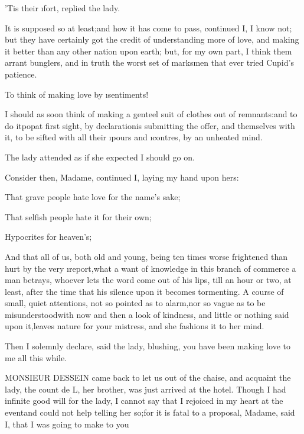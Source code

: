 \documentclass[twoside]{article}
\begin{document}
’Tis their \i{fort}, replied the lady.

It is supposed so at least;\tsk and how it has come to pass, continued I, I
know not; but they have certainly got the credit of understanding more of
love, and making it better than any other nation upon earth; but, for my
own part, I think them arrant bunglers, and in truth the worst set of
marksmen that ever tried Cupid’s patience.

\tsk To think of making love by \i{sentiments}!

I should as soon think of making a genteel suit of clothes out of
remnants:\tsk and to do it\tsk pop\tsk at first sight, by declaration\tsk is submitting
the offer, and themselves with it, to be sifted with all their \i{pours}
and \i{contres}, by an unheated mind.

The lady attended as if she expected I should go on.

Consider then, Madame, continued I, laying my hand upon hers:\tsk 

That grave people hate love for the name’s sake;\tsk 

That selfish people hate it for their own;\tsk 

Hypocrites for heaven’s;\tsk 

And that all of us, both old and young, being ten times worse frightened
than hurt by the very \i{report},\tsk what a want of knowledge in this branch
of commerce a man betrays, whoever lets the word come out of his lips,
till an hour or two, at least, after the time that his silence upon it
becomes tormenting.  A course of small, quiet attentions, not so pointed
as to alarm,\tsk nor so vague as to be misunderstood\tsk with now and then a look
of kindness, and little or nothing said upon it,\tsk leaves nature for your
mistress, and she fashions it to her mind.\tsk 

Then I solemnly declare, said the lady, blushing, you have been making
love to me all this while.






MONSIEUR DESSEIN came back to let us out of the chaise, and acquaint the
lady, the count de L\tsk , her brother, was just arrived at the hotel.
Though I had infinite good will for the lady, I cannot say that I
rejoiced in my heart at the event\tsk and could not help telling her so;\tsk for
it is fatal to a proposal, Madame, said I, that I was going to make to
you\tsk 
\end{document}
